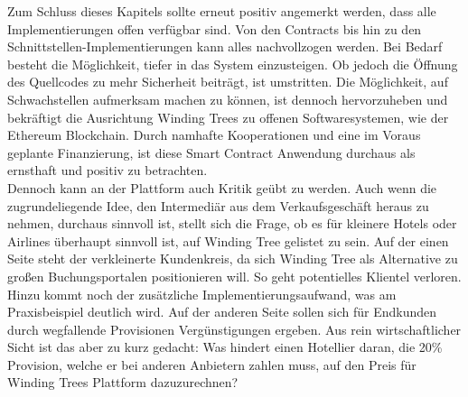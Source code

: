 Zum Schluss dieses Kapitels sollte erneut positiv angemerkt werden, dass alle Implementierungen offen verfügbar sind. Von den Contracts bis hin zu den Schnittstellen-Implementierungen kann alles nachvollzogen werden. Bei Bedarf besteht die Möglichkeit, tiefer in das System einzusteigen. Ob jedoch die Öffnung des Quellcodes zu mehr Sicherheit beiträgt, ist umstritten. Die Möglichkeit, auf Schwachstellen aufmerksam machen zu können, ist dennoch hervorzuheben und bekräftigt die Ausrichtung Winding Trees zu offenen Softwaresystemen, wie der Ethereum Blockchain. Durch namhafte Kooperationen und eine im Voraus geplante Finanzierung, ist diese Smart Contract Anwendung durchaus als ernsthaft und positiv zu betrachten.\\ 
Dennoch kann an der Plattform auch Kritik geübt zu werden. Auch wenn die zugrundeliegende Idee, den Intermediär aus dem Verkaufsgeschäft heraus zu nehmen, durchaus sinnvoll ist, stellt sich die Frage, ob es für kleinere Hotels oder Airlines überhaupt sinnvoll ist, auf Winding Tree gelistet zu sein. Auf der einen Seite steht der verkleinerte Kundenkreis, da sich Winding Tree als Alternative zu großen Buchungsportalen positionieren will. So geht potentielles Klientel verloren. Hinzu kommt noch der zusätzliche Implementierungsaufwand, was am Praxisbeispiel deutlich wird. Auf der anderen Seite sollen sich für Endkunden durch wegfallende Provisionen Vergünstigungen ergeben. Aus rein wirtschaftlicher Sicht ist das aber zu kurz gedacht: Was hindert einen Hotellier daran, die 20\% Provision, welche er bei anderen Anbietern zahlen muss, auf den Preis für Winding Trees Plattform dazuzurechnen? 

